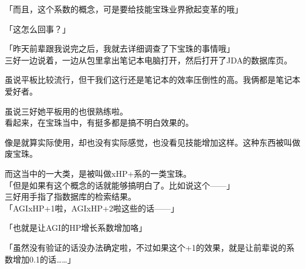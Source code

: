 「而且，这个系数的概念，可是要给技能宝珠业界掀起变革的哦」

「这怎么回事？」

「昨天前辈跟我说完之后，我就去详细调查了下宝珠的事情哦」\\

三好一边说着，一边从包里拿出笔记本电脑打开，然后打开了JDA的数据库页。

虽说平板比较流行，但干我们这行还是笔记本的效率压倒性的高。我俩都是笔记本爱好者。

虽说三好她平板用的也很熟练啦。\\

看起来，在宝珠当中，有挺多都是搞不明白效果的。

像是就算实际使用，却也没有实际感觉，也没看见技能增加这样。这种东西被叫做废宝珠。

而这当中的一大类，是被叫做xHP+系的一类宝珠。\\

「但是如果有这个概念的话就能够搞明白了。比如说这个——」\\

三好用手指了指数据库的检索结果。\\

「AGIxHP+1啦，AGIxHP+2啦这些的话——」

「也就是让AGI的HP增长系数增加咯」

「虽然没有验证的话没办法确定啦，不过如果这个+1的效果，就是让前辈说的系数增加0.1的话……」

